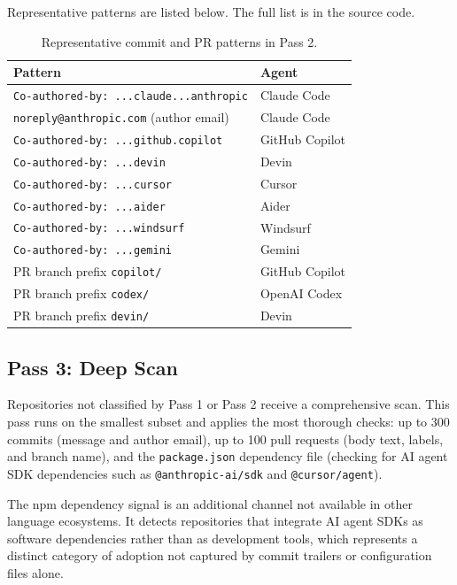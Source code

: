 \documentclass[12pt, a4paper]{article}
\begin{document}
Representative patterns are listed below. The full list is in the source code.

\begin{table}[h]
\centering
\caption{Representative commit and PR patterns in Pass 2.}
\begin{tabular}{@{}ll@{}}
\toprule
\textbf{Pattern} & \textbf{Agent} \\
\midrule
\texttt{Co-authored-by: ...claude...anthropic} & Claude Code \\
\texttt{noreply@anthropic.com} (author email)  & Claude Code \\
\texttt{Co-authored-by: ...github.copilot}     & GitHub Copilot \\
\texttt{Co-authored-by: ...devin}              & Devin \\
\texttt{Co-authored-by: ...cursor}             & Cursor \\
\texttt{Co-authored-by: ...aider}              & Aider \\
\texttt{Co-authored-by: ...windsurf}           & Windsurf \\
\texttt{Co-authored-by: ...gemini}             & Gemini \\
PR branch prefix \texttt{copilot/}            & GitHub Copilot \\
PR branch prefix \texttt{codex/}              & OpenAI Codex \\
PR branch prefix \texttt{devin/}              & Devin \\
\bottomrule
\end{tabular}
\end{table}

\subsection{Pass 3: Deep Scan}

Repositories not classified by Pass 1 or Pass 2 receive a comprehensive
scan. This pass runs on the smallest subset and applies the most thorough
checks: up to 300 commits (message and author email), up to 100 pull
requests (body text, labels, and branch name), and the
\texttt{package.json} dependency file (checking for AI agent SDK
dependencies such as \texttt{@anthropic-ai/sdk} and \texttt{@cursor/agent}).

The npm dependency signal is an additional channel not available in other
language ecosystems. It detects repositories that integrate AI agent SDKs as
software dependencies rather than as development tools, which represents a
distinct category of adoption not captured by commit trailers or configuration
files alone.
\end{document}
